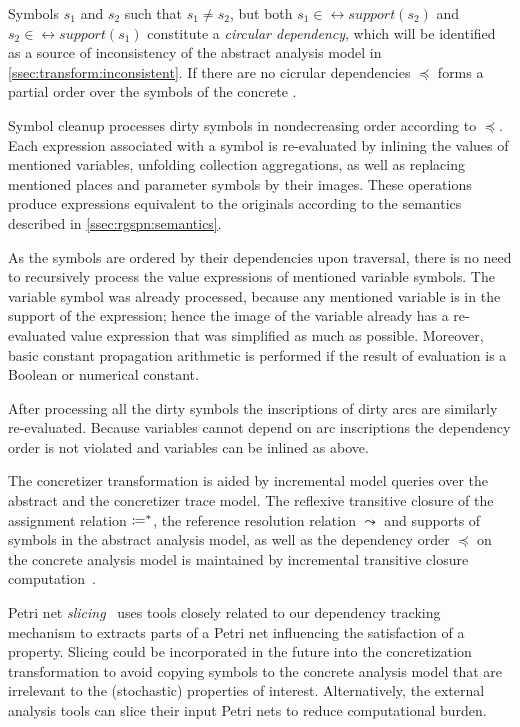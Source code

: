 Symbols \(s_1\) and \(s_2\) such that \(s_1 \neq s_2\), but both \(s_1 \in \rel{support}(s_2)\) and \(s_2 \in \rel{support}(s_1)\) constitute a \emph{circular dependency}, which will be identified as a source of inconsistency of the abstract analysis model in \vref{ssec:transform:inconsistent}. If there are no cicrular dependencies \(\preceq\) forms a partial order over the symbols of the concrete .

Symbol cleanup processes dirty symbols in nondecreasing order according to \(\preceq\). Each expression associated with a symbol is re-evaluated by inlining the values of mentioned variables, unfolding collection aggregations, as well as replacing mentioned places and parameter symbols by their images. These operations produce expressions equivalent to the originals according to the semantics described in \vref{ssec:rgspn:semantics}.

As the symbols are ordered by their dependencies upon traversal, there is no need to recursively process the value expressions of mentioned variable symbols. The variable symbol was already processed, because any mentioned variable is in the support of the expression; hence the image of the variable already has a re-evaluated value expression that was simplified as much as possible. Moreover, basic constant propagation arithmetic is performed if the result of evaluation is a Boolean or numerical constant.

After processing all the dirty symbols the inscriptions of dirty arcs are similarly re-evaluated. Because variables cannot depend on arc inscriptions the dependency order is not violated and variables can be inlined as above.

The concretizer transformation is aided by incremental model queries over the abstract  and the concretizer trace model. The reflexive transitive closure of the assignment relation \(\coloneq^*\), the reference resolution relation \(\leadsto\) and supports of symbols in the abstract analysis model, as well as the dependency order \(\preceq\) on the concrete analysis model is maintained by incremental transitive closure computation~\citep{Bergmann12incscc}.

\begin{remark}
  Petri net \emph{slicing}~ uses tools closely related to our dependency tracking mechanism to extracts parts of a Petri net influencing the satisfaction of a property. Slicing could be incorporated in the future into the concretization transformation to avoid copying symbols to the concrete analysis model that are irrelevant to the (stochastic) properties of interest. Alternatively, the external analysis tools can slice their input Petri nets to reduce computational burden.
\end{remark}


